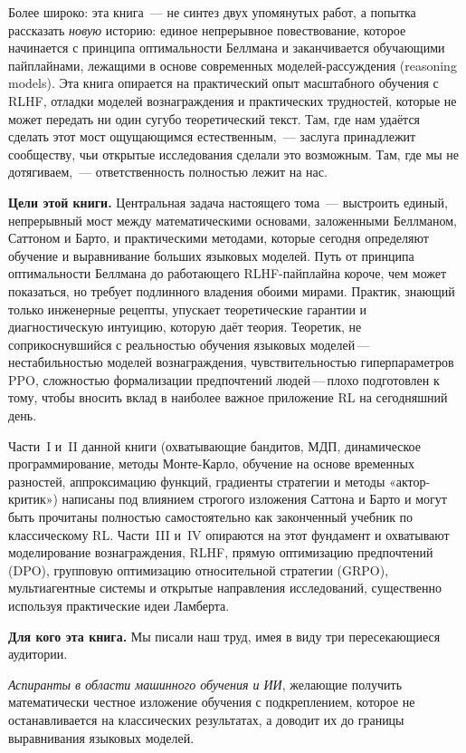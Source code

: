 Более широко: эта книга~--- не синтез двух упомянутых работ, а попытка рассказать \emph{новую} историю: единое непрерывное повествование, которое начинается с принципа оптимальности Беллмана и заканчивается обучающими пайплайнами, лежащими в основе современных моделей-рассуждения (reasoning models). Эта книга опирается на практический опыт масштабного обучения с RLHF, отладки моделей вознаграждения и практических трудностей, которые не может передать ни один сугубо теоретический текст. Там, где нам удаётся сделать этот мост ощущающимся естественным,~--- заслуга принадлежит сообществу, чьи открытые исследования сделали это возможным. Там, где мы не дотягиваем,~--- ответственность полностью лежит на нас.


\medskip

\textbf{Цели этой книги.}\quad
Центральная задача настоящего тома~--- выстроить единый, непрерывный мост между математическими основами, заложенными Беллманом, Саттоном и Барто, и практическими методами, которые сегодня определяют обучение и выравнивание больших языковых моделей. Путь от принципа оптимальности Беллмана до работающего RLHF-пайплайна короче, чем может показаться, но требует подлинного владения обоими мирами. Практик, знающий только инженерные рецепты, упускает теоретические гарантии и диагностическую интуицию, которую даёт теория. Теоретик, не соприкоснувшийся с реальностью обучения языковых моделей\,---\,нестабильностью моделей вознаграждения, чувствительностью гиперпараметров PPO, сложностью формализации предпочтений людей\,---\,плохо подготовлен к тому, чтобы вносить вклад в наиболее важное приложение RL на сегодняшний день.

Части~I и~II данной книги (охватывающие бандитов, МДП, динамическое программирование, методы Монте-Карло, обучение на основе временных разностей, аппроксимацию функций, градиенты стратегии и методы «актор-критик») написаны под влиянием строгого изложения Саттона и Барто и могут быть прочитаны полностью самостоятельно как законченный учебник по классическому RL. Части~III и~IV опираются на этот фундамент и охватывают моделирование вознаграждения, RLHF, прямую оптимизацию предпочтений (DPO), групповую оптимизацию относительной стратегии (GRPO), мультиагентные системы и открытые направления исследований, существенно используя практические идеи Ламберта.

\medskip

\textbf{Для кого эта книга.}\quad
Мы писали наш труд, имея в виду три пересекающиеся аудитории.

\emph{Аспиранты в области машинного обучения и ИИ}, желающие получить математически честное изложение обучения с подкреплением, которое не останавливается на классических результатах, а доводит их до границы выравнивания языковых моделей.

